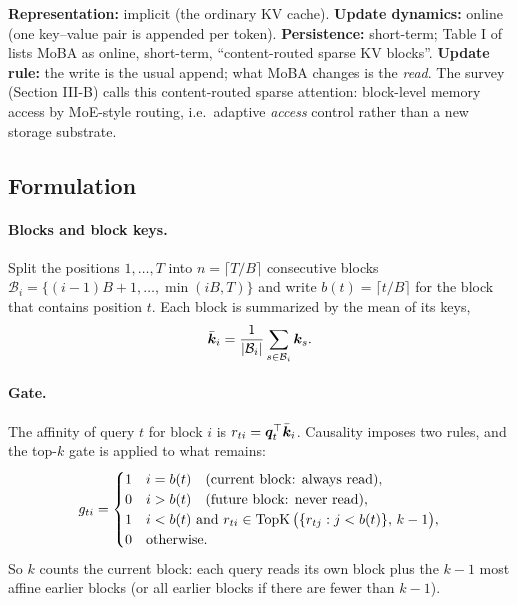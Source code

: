 \begin{taxonomy}
\textbf{Representation:} implicit (the ordinary KV cache).
\textbf{Update dynamics:} online (one key--value pair is appended per token).
\textbf{Persistence:} short-term; Table I of \citet{zhoubian2026memory} lists MoBA as online,
short-term, ``content-routed sparse KV blocks''.
\textbf{Update rule:} the write is the usual append; what MoBA changes is the \emph{read}. The
survey (Section III-B) calls this content-routed sparse attention: block-level memory access
by MoE-style routing, i.e.\ adaptive \emph{access} control rather than a new storage substrate.
\end{taxonomy}

\subsection{Formulation}

\paragraph{Blocks and block keys.}
Split the positions $1,\dots,T$ into $n=\lceil T/B\rceil$ consecutive blocks
$\mathcal{B}_i=\{(i-1)B+1,\dots,\min(iB,T)\}$ and write $b(t)=\lceil t/B\rceil$ for the block
that contains position $t$. Each block is summarized by the mean of its keys,
\begin{equation}\label{eq:c04-moba-kbar}
  \bar{\bm{k}}_i = \frac{1}{\left\lvert \mathcal{B}_i\right\rvert}\sum_{s\in\mathcal{B}_i}\bm{k}_s .
\end{equation}

\paragraph{Gate.}
The affinity of query $t$ for block $i$ is $r_{ti}=\bm{q}_t^{\top}\bar{\bm{k}}_i$. Causality imposes two
rules, and the top-$k$ gate is applied to what remains:
\begin{equation}\label{eq:c04-moba-gate}
  g_{ti} = \begin{cases}
    1 & i = b(t) \quad\text{(current block: always read)},\\
    0 & i > b(t) \quad\text{(future block: never read)},\\
    1 & i < b(t) \text{ and } r_{ti}\in\operatorname{TopK}\big(\{r_{tj}: j<b(t)\},\,k-1\big),\\
    0 & \text{otherwise}.
  \end{cases}
\end{equation}
So $k$ counts the current block: each query reads its own block plus the $k-1$ most affine
earlier blocks (or all earlier blocks if there are fewer than $k-1$).

